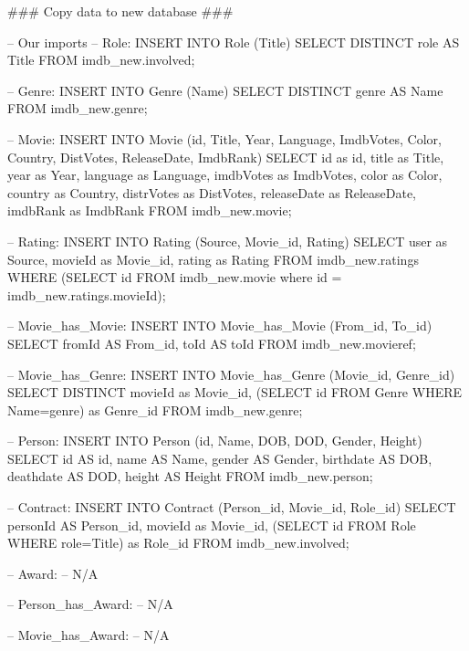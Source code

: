 \begin{spverbatim}
### Copy data to new database ###

-- Our imports
-- Role:
INSERT INTO Role (Title) SELECT DISTINCT role AS Title FROM imdb_new.involved;

-- Genre:
INSERT INTO Genre (Name) SELECT DISTINCT genre AS Name FROM imdb_new.genre;

-- Movie:
INSERT INTO Movie (id, Title, Year, Language, ImdbVotes, Color, Country, DistVotes, ReleaseDate, ImdbRank) SELECT id as id, title as Title, year as Year, language as Language, imdbVotes as ImdbVotes, color as Color, country as Country, distrVotes as DistVotes, releaseDate as ReleaseDate, imdbRank as ImdbRank FROM imdb_new.movie;

-- Rating:
INSERT INTO Rating (Source, Movie_id, Rating) SELECT user as Source, movieId as Movie_id, rating as Rating FROM imdb_new.ratings WHERE (SELECT id FROM imdb_new.movie where id = imdb_new.ratings.movieId);

-- Movie_has_Movie:
INSERT INTO Movie_has_Movie (From_id, To_id) SELECT fromId AS From_id, toId AS toId FROM imdb_new.movieref;

-- Movie_has_Genre:
INSERT INTO Movie_has_Genre (Movie_id, Genre_id) SELECT DISTINCT movieId as Movie_id, (SELECT id FROM Genre WHERE Name=genre) as Genre_id FROM imdb_new.genre;

-- Person:
INSERT INTO Person (id, Name, DOB, DOD, Gender, Height) SELECT id AS id, name AS Name, gender AS Gender, birthdate AS DOB, deathdate AS DOD, height AS Height FROM imdb_new.person;

-- Contract:
INSERT INTO Contract (Person_id, Movie_id, Role_id) SELECT personId AS Person_id, movieId as Movie_id, (SELECT id FROM Role WHERE role=Title) as Role_id FROM imdb_new.involved;

-- Award:
-- N/A

-- Person_has_Award:
-- N/A

-- Movie_has_Award:
-- N/A
\end{spverbatim}
\newpage

